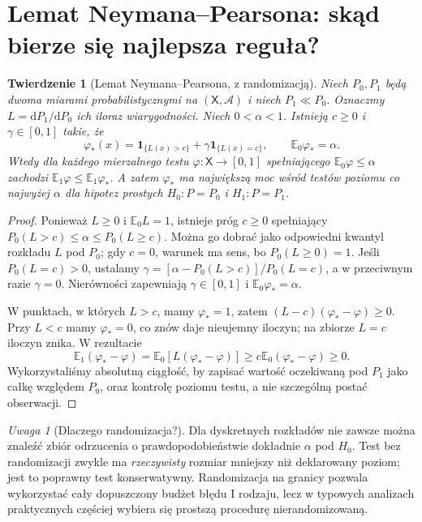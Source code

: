 \documentclass[11pt,a4paper,oneside]{report}
\numberwithin{equation}{chapter}
\theoremstyle{plain}
\newtheorem{twierdzenie}{Twierdzenie}[chapter]
\theoremstyle{definition}
\theoremstyle{remark}
\newtheorem{uwaga}{Uwaga}[chapter]
\newcommand{\E}{\mathbb E}
\newcommand{\ind}[1]{\mathbf 1_{#1}}
\newcommand{\dd}{\mathrm d}
\begin{document}
\section{Lemat Neymana--Pearsona: skąd bierze się najlepsza reguła?}
\begin{twierdzenie}[Lemat Neymana--Pearsona, z randomizacją]
\label{thm:neyman-pearson}
Niech $P_0,P_1$ będą dwoma miarami probabilistycznymi na
$(\mathsf X,\mathcal A)$ i niech $P_1\ll P_0$. Oznaczmy
$L=\dd P_1/\dd P_0$ ich iloraz wiarygodności. Niech
$0<\alpha<1$. Istnieją $c\ge0$ i $\gamma\in[0,1]$ takie, że
\[
 \varphi_*(x)=\ind{\{L(x)>c\}}+
 \gamma\ind{\{L(x)=c\}},\qquad \E_0\varphi_*=\alpha.
\]
Wtedy dla każdego mierzalnego testu $\varphi:\mathsf X\to[0,1]$
spełniającego $\E_0\varphi\le\alpha$ zachodzi
$\E_1\varphi\le\E_1\varphi_*$. A zatem $\varphi_*$ ma
największą moc wśród testów poziomu co najwyżej $\alpha$ dla
hipotez prostych $H_0:P=P_0$ i $H_1:P=P_1$.
\end{twierdzenie}
\begin{proof}
Ponieważ $L\ge0$ i $\E_0L=1$, istnieje próg $c\ge0$ spełniający
$P_0(L>c)\le\alpha\le P_0(L\ge c)$. Można go dobrać
jako odpowiedni kwantyl rozkładu $L$ pod $P_0$; gdy $c=0$,
warunek ma sens, bo $P_0(L\ge0)=1$. Jeśli
$P_0(L=c)>0$, ustalamy
$\gamma=[\alpha-P_0(L>c)]/P_0(L=c)$, a w przeciwnym razie
$\gamma=0$. Nierówności zapewniają $\gamma\in[0,1]$ i
$\E_0\varphi_*=\alpha$.

W punktach, w których $L>c$, mamy $\varphi_*=1$, zatem
$(L-c)(\varphi_*-\varphi)\ge0$. Przy $L<c$ mamy
$\varphi_*=0$, co znów daje nieujemny iloczyn; na zbiorze
$L=c$ iloczyn znika. W rezultacie
\[
 \E_1(\varphi_*-\varphi)
 =\E_0[L(\varphi_*-\varphi)]
 \ge c\E_0(\varphi_*-\varphi)\ge0.
\]
Wykorzystaliśmy absolutną ciągłość, by zapisać wartość
oczekiwaną pod $P_1$ jako całkę względem $P_0$, oraz kontrolę
poziomu testu, a nie szczególną postać obserwacji.
\end{proof}

\begin{uwaga}[Dlaczego randomizacja?]
Dla dyskretnych rozkładów nie zawsze można znaleźć zbiór
odrzucenia o prawdopodobieństwie dokładnie $\alpha$ pod $H_0$.
Test bez randomizacji zwykle ma \emph{rzeczywisty} rozmiar
mniejszy niż deklarowany poziom; jest to poprawny test
konserwatywny. Randomizacja na granicy pozwala wykorzystać
cały dopuszczony budżet błędu I rodzaju, lecz w typowych analizach
praktycznych częściej wybiera się prostszą procedurę
nierandomizowaną.
\end{uwaga}
\end{document}
